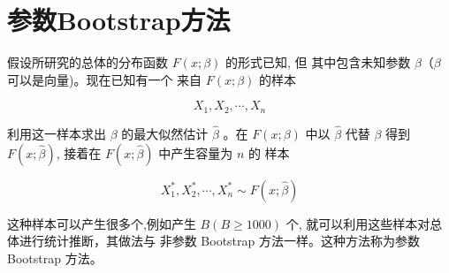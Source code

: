\section{参数Bootstrap方法}

假设所研究的总体的分布函数 $ F(x ; \beta) $ 的形式已知, 但 其中包含未知参数 $ \beta （ \beta $ 可以是向量)。现在已知有一个 来自 $ F(x ; \beta) $ 的样本

$$ X_{1}, X_{2}, \cdots, X_{n} $$

利用这一样本求出 $ \beta $ 的最大似然估计 $ \hat{\beta} $ 。在 $ F(x ; \beta) $ 中以 $ \hat{\beta} $ 代替 $ \beta $ 得到 $ F(x ; \hat{\beta}) $, 接着在 $ F(x ; \hat{\beta}) $ 中产生容量为 $ n $ 的 样本

$$ X_{1}^{*}, X_{2}^{*}, \cdots, X_{n}^{*} \sim F(x ; \hat{\beta}) $$

这种样本可以产生很多个,例如产生 $ B(B \geq 1000) $ 个, 就可以利用这些样本对总体进行统计推断，其做法与 非参数 Bootstrap 方法一样。这种方法称为参数 Bootstrap 方法。